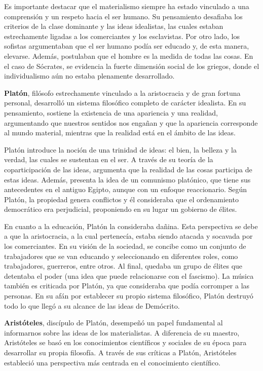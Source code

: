 \documentclass[
  jou,
  floatsintext,
  longtable,
  a4paper,
  nolmodern,
  notxfonts,
  notimes,
  12pt,
  colorlinks=true,linkcolor=blue,citecolor=blue,urlcolor=blue]{apa7}
\begin{document}
Es importante destacar que el materialismo siempre ha estado vinculado a
una comprensión y un respeto hacia el ser humano. Su pensamiento
desafiaba los criterios de la clase dominante y las ideas idealistas,
las cuales estaban estrechamente ligadas a los comerciantes y los
esclavistas. Por otro lado, los sofistas argumentaban que el ser humano
podía ser educado y, de esta manera, elevarse. Además, postulaban que el
hombre es la medida de todas las cosas. En el caso de Sócrates, se
evidencia la fuerte dimensión social de los griegos, donde el
individualismo aún no estaba plenamente desarrollado.

\textbf{Platón}, filósofo estrechamente vinculado a la aristocracia y de
gran fortuna personal, desarrolló un sistema filosófico completo de
carácter idealista. En su pensamiento, sostiene la existencia de una
apariencia y una realidad, argumentando que nuestros sentidos nos
engañan y que la apariencia corresponde al mundo material, mientras que
la realidad está en el ámbito de las ideas.

Platón introduce la noción de una trinidad de ideas: el bien, la belleza
y la verdad, las cuales se sustentan en el ser. A través de su teoría de
la coparticipación de las ideas, argumenta que la realidad de las cosas
participa de estas ideas. Además, presenta la idea de un comunismo
platónico, que tiene sus antecedentes en el antiguo Egipto, aunque con
un enfoque reaccionario. Según Platón, la propiedad genera conflictos y
él consideraba que el ordenamiento democrático era perjudicial,
proponiendo en su lugar un gobierno de élites.

En cuanto a la educación, Platón la consideraba dañina. Esta perspectiva
se debe a que la aristocracia, a la cual pertenecía, estaba siendo
atacada y socavada por los comerciantes. En su visión de la sociedad, se
concibe como un conjunto de trabajadores que se van educando y
seleccionando en diferentes roles, como trabajadores, guerreros, entre
otros. Al final, quedaba un grupo de élites que detentaba el poder (una
idea que puede relacionarse con el fascismo). La música también es
criticada por Platón, ya que consideraba que podía corromper a las
personas. En su afán por establecer su propio sistema filosófico, Platón
destruyó todo lo que llegó a su alcance de las ideas de Demócrito.

\textbf{Aristóteles}, discípulo de Platón, desempeñó un papel
fundamental al informarnos sobre las ideas de los materialistas. A
diferencia de su maestro, Aristóteles se basó en los conocimientos
científicos y sociales de su época para desarrollar su propia filosofía.
A través de sus críticas a Platón, Aristóteles estableció una
perspectiva más centrada en el conocimiento científico.
\end{document}
